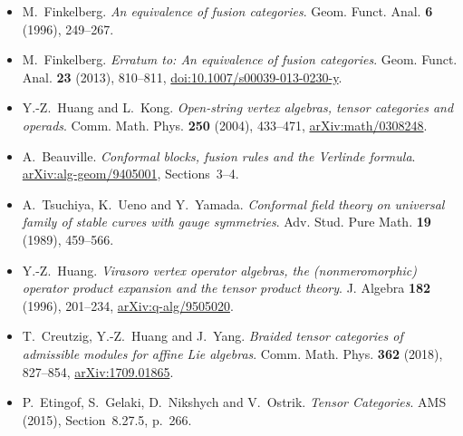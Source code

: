 \begin{itemize}
\item M.~Finkelberg. \emph{An equivalence of fusion categories}. Geom. Funct. Anal. \textbf{6} (1996), 249--267.

\item M.~Finkelberg. \emph{Erratum to: An equivalence of fusion categories}. Geom. Funct. Anal. \textbf{23} (2013), 810--811, \href{https://doi.org/10.1007/s00039-013-0230-y}{doi:10.1007/s00039-013-0230-y}.

\item Y.-Z.~Huang and L.~Kong. \emph{Open-string vertex algebras, tensor categories and operads}. Comm. Math. Phys. \textbf{250} (2004), 433--471, \href{https://arxiv.org/abs/math/0308248}{arXiv:math/0308248}.

\item A.~Beauville. \emph{Conformal blocks, fusion rules and the Verlinde formula}. \href{https://arxiv.org/abs/alg-geom/9405001}{arXiv:alg-geom/9405001}, Sections~3--4.

\item A.~Tsuchiya, K.~Ueno and Y.~Yamada. \emph{Conformal field theory on universal family of stable curves with gauge symmetries}. Adv. Stud. Pure Math. \textbf{19} (1989), 459--566.

\item Y.-Z.~Huang. \emph{Virasoro vertex operator algebras, the (nonmeromorphic) operator product expansion and the tensor product theory}. J. Algebra \textbf{182} (1996), 201--234, \href{https://arxiv.org/abs/q-alg/9505020}{arXiv:q-alg/9505020}.

\item T.~Creutzig, Y.-Z.~Huang and J.~Yang. \emph{Braided tensor categories of admissible modules for affine Lie algebras}. Comm. Math. Phys. \textbf{362} (2018), 827--854, \href{https://arxiv.org/abs/1709.01865}{arXiv:1709.01865}.

\item P.~Etingof, S.~Gelaki, D.~Nikshych and V.~Ostrik. \emph{Tensor Categories}. AMS (2015), Section~8.27.5, p.~266.

\end{itemize}
